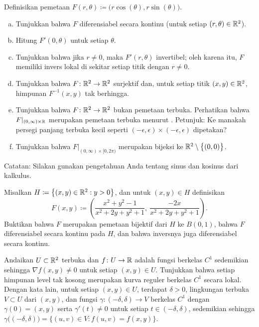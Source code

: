 \begin{exercise} \label{mv:exercise:polarcoordinates}
Definisikan pemetaan $F(r,\theta) \coloneqq \bigl(r \cos(\theta), r \sin(\theta) \bigr)$.
\begin{enumerate}[a)]
\item
Tunjukkan bahwa $F$ diferensiabel secara kontinu (untuk setiap $(r,\theta) \in
{\mathbb{R}}^2$).
\item
Hitung $F'(0,\theta)$ untuk setiap $\theta$.
\item
Tunjukkan bahwa jika $r \neq 0$, maka $F'(r,\theta)$ invertibel; oleh karena itu,
$F$ memiliki invers lokal di sekitar setiap titik dengan $r \neq 0$.
\item
Tunjukkan bahwa $F \colon {\mathbb{R}}^2 \to {\mathbb{R}}^2$ surjektif dan, untuk setiap titik $(x,y) \in
{\mathbb{R}}^2$, himpunan $F^{-1}(x,y)$ tak berhingga.
\item
Tunjukkan bahwa $F \colon {\mathbb{R}}^2 \to {\mathbb{R}}^2$ bukan pemetaan terbuka.
Perhatikan bahwa $F|_{(0,\infty) \times {\mathbb{R}}}$ merupakan pemetaan terbuka
menurut .
Petunjuk: Ke manakah
persegi panjang terbuka kecil seperti $(-\epsilon,\epsilon) \times
(-\epsilon,\epsilon)$ dipetakan?
\item
Tunjukkan bahwa $F|_{(0,\infty) \times [0,2\pi)}$ merupakan bijeksi ke
${\mathbb{R}}^2 \setminus \bigl\{ (0,0) \bigr\}$.
\end{enumerate}
Catatan: Silakan gunakan pengetahuan Anda tentang sinus dan kosinus dari kalkulus.
\end{exercise}

\begin{exercise}
Misalkan $H \coloneqq \bigl\{ (x,y) \in {\mathbb{R}}^2 : y > 0 \bigr\}$, dan untuk $(x,y) \in H$
definisikan
\begin{equation*}
F(x,y) \coloneqq \left(
\frac{x^2+y^2-1}{x^2+2y+y^2+1}
,~
\frac{-2x}{x^2+2y+y^2+1}
\right) .
\end{equation*}
Buktikan bahwa $F$ merupakan pemetaan bijektif dari $H$ ke $B(0,1)$, bahwa $F$
diferensiabel secara kontinu pada $H$, dan bahwa inversnya juga diferensiabel
secara kontinu.
\end{exercise}

\begin{exercise}
Andaikan $U \subset {\mathbb{R}}^2$ terbuka dan $f \colon U \to {\mathbb{R}}$ adalah
fungsi berkelas $C^1$ sedemikian
sehingga $\nabla f(x,y) \neq 0$ untuk setiap $(x,y) \in U$.  Tunjukkan bahwa setiap
himpunan level tak kosong merupakan kurva reguler berkelas $C^1$ secara lokal.  Dengan kata lain,
untuk setiap $(x,y) \in U$, terdapat $\delta > 0$, lingkungan terbuka $V \subset U$ dari $(x,y)$,
dan fungsi $\gamma \colon (-\delta,\delta) \to V$ berkelas $C^1$ dengan
$\gamma(0)=(x,y)$ serta $\gamma'(t) \neq 0$ untuk setiap $t \in (-\delta,\delta)$, sedemikian sehingga
$\gamma\bigl((-\delta,\delta)\bigr)
= \bigl\{(u,v) \in V : f(u,v)=f(x,y)\bigr\}$.
\end{exercise}


